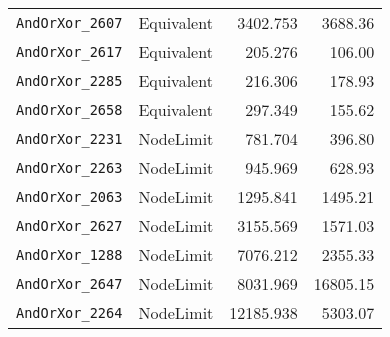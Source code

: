 \begin{tabular}{llrr}
\texttt{AndOrXor\_2607} & Equivalent & 3402.753 & 3688.36 \\
\texttt{AndOrXor\_2617} & Equivalent & 205.276 & 106.00 \\
\texttt{AndOrXor\_2285} & Equivalent & 216.306 & 178.93 \\
\texttt{AndOrXor\_2658} & Equivalent & 297.349 & 155.62 \\
\texttt{AndOrXor\_2231} & NodeLimit & 781.704 & 396.80 \\
\texttt{AndOrXor\_2263} & NodeLimit & 945.969 & 628.93 \\
\texttt{AndOrXor\_2063} & NodeLimit & 1295.841 & 1495.21 \\
\texttt{AndOrXor\_2627} & NodeLimit & 3155.569 & 1571.03 \\
\texttt{AndOrXor\_1288} & NodeLimit & 7076.212 & 2355.33 \\
\texttt{AndOrXor\_2647} & NodeLimit & 8031.969 & 16805.15 \\
\texttt{AndOrXor\_2264} & NodeLimit & 12185.938 & 5303.07 \\
\bottomrule
\end{tabular}

